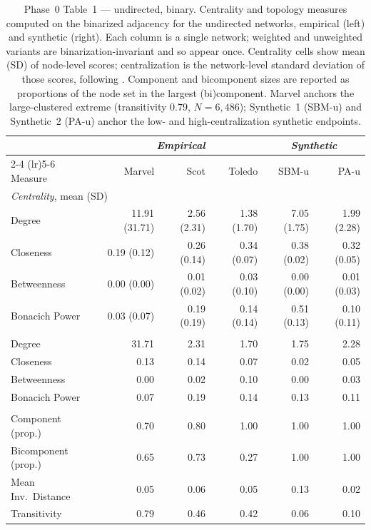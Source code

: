 \documentclass[11pt]{article}
\begin{document}
\begin{table}[!htbp]
\centering
\footnotesize
\setlength{\tabcolsep}{4pt}
\begin{tabular}{l r r r | r r}
\toprule
& \multicolumn{3}{c|}{\textit{Empirical}} & \multicolumn{2}{c}{\textit{Synthetic}} \\
\cmidrule(lr){2-4} \cmidrule(lr){5-6}
Measure & Marvel & Scot & Toledo & SBM-u & PA-u \\
\midrule
\multicolumn{6}{l}{\textit{Centrality}, mean (SD)} \\
Degree         & 11.91 (31.71) & 2.56 (2.31) & 1.38 (1.70) & 7.05 (1.75) & 1.99 (2.28) \\
Closeness      & 0.19 (0.12)   & 0.26 (0.14) & 0.34 (0.07) & 0.38 (0.02) & 0.32 (0.05) \\
Betweenness    & 0.00 (0.00)   & 0.01 (0.02) & 0.03 (0.10) & 0.00 (0.00) & 0.01 (0.03) \\
Bonacich Power & 0.03 (0.07)   & 0.19 (0.19) & 0.14 (0.14) & 0.51 (0.13) & 0.10 (0.11) \\
\addlinespace
\multicolumn{6}{l}{\textit{Centralization} (SD of node scores)} \\
Degree         & 31.71 & 2.31  & 1.70  & 1.75  & 2.28 \\
Closeness      & 0.13  & 0.14  & 0.07  & 0.02  & 0.05 \\
Betweenness    & 0.00  & 0.02  & 0.10  & 0.00  & 0.03 \\
Bonacich Power & 0.07  & 0.19  & 0.14  & 0.13  & 0.11 \\
\addlinespace
\multicolumn{6}{l}{\textit{Topology}} \\
Component (prop.)   & 0.70 & 0.80 & 1.00 & 1.00 & 1.00 \\
Bicomponent (prop.) & 0.65 & 0.73 & 0.27 & 1.00 & 1.00 \\
Mean Inv.\ Distance & 0.05 & 0.06 & 0.05 & 0.13 & 0.02 \\
Transitivity        & 0.79 & 0.46 & 0.42 & 0.06 & 0.10 \\
\bottomrule
\end{tabular}
\caption{Phase~0 Table~1 --- undirected, binary. Centrality and topology measures computed on the binarized adjacency for the undirected networks, empirical (left) and synthetic (right). Each column is a single network; weighted and unweighted variants are binarization-invariant and so appear once. Centrality cells show mean (SD) of node-level scores; centralization is the network-level standard deviation of those scores, following \citet{SmithMorganMoody2022}. Component and bicomponent sizes are reported as proportions of the node set in the largest (bi)component. Marvel anchors the large-clustered extreme (transitivity 0.79, $N = 6{,}486$); Synthetic~1 (SBM-u) and Synthetic~2 (PA-u) anchor the low- and high-centralization synthetic endpoints.}
\label{tab:phase0-undir-binary}
\end{table}
\end{document}

